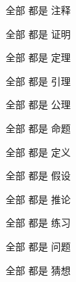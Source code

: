 \begin{remark}
	全部
	都是
	注释
\end{remark}

\begin{prof}
	全部
	都是
	证明
\end{prof}
\begin{theorem}
	全部
	都是
	定理
\end{theorem}
\begin{lemma}
	全部
	都是
	引理
\end{lemma}
\begin{axiom}
	全部
	都是
	公理
\end{axiom}
\begin{proposition}
	全部
	都是
	命题
\end{proposition}
\begin{definition}
	全部
	都是
	定义
\end{definition}
\begin{assumption}
	全部
	都是
	假设
\end{assumption}

\begin{corollary}
	全部
	都是
	推论
\end{corollary}
\begin{exercise}
	全部
	都是
	练习
\end{exercise}

\begin{problem}
	全部
	都是
	问题
\end{problem}
\begin{conjecture}
	全部
	都是
	猜想
\end{conjecture}



